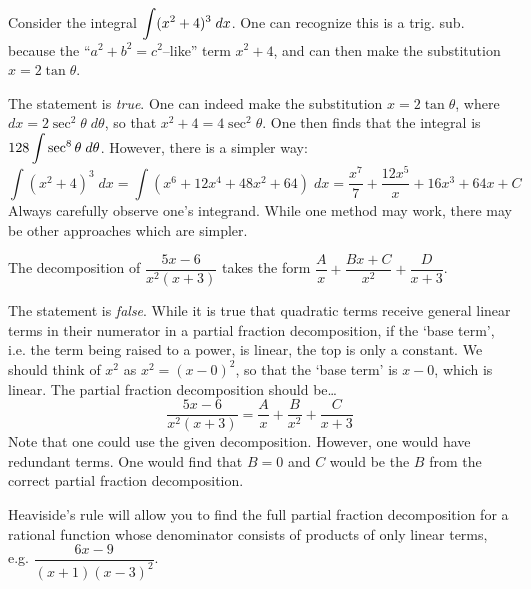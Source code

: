 \documentclass[11pt,letterpaper]{article}
\begin{document}
\newpage



 Consider the integral $\displaystyle\int (x^2 + 4)^3 \;dx$. One can recognize this is a trig. sub. because the ``$a^2 + b^2= c^2$--like'' term $x^2 + 4$, and can then make the substitution $x= 2 \tan \theta$. \pspace

\sol The statement is \textit{true}. One can indeed make the substitution $x= 2 \tan \theta$, where $dx= 2 \sec^2 \theta \;d\theta$, so that $x^2 + 4= 4 \sec^2 \theta$. One then finds that the integral is $\displaystyle 128 \int \sec^8 \theta \;d\theta$. However, there is a simpler way:
	\[
	\int (x^2 + 4)^3 \;dx= \int \left( x^6 + 12x^4 + 48x^2 + 64 \right) \;dx= \dfrac{x^7}{7} + \dfrac{12x^5}{x} + 16x^3 + 64x + C
	\]
Always carefully observe one's integrand. While one method may work, there may be other approaches which are simpler. \pvspace{1.3cm}



 The decomposition of $\dfrac{5x - 6}{x^2(x + 3)}$ takes the form $\dfrac{A}{x} + \dfrac{Bx + C}{x^2} + \dfrac{D}{x + 3}$. \pspace

\sol The statement is \textit{false}. While it is true that quadratic terms receive general linear terms in their numerator in a partial fraction decomposition, if the `base term', i.e. the term being raised to a power, is linear, the top is only a constant. We should think of $x^2$ as $x^2= (x - 0)^2$, so that the `base term' is $x - 0$, which is linear. The partial fraction decomposition should be\dots
	\[
	\dfrac{5x - 6}{x^2(x + 3)}= \dfrac{A}{x} + \dfrac{B}{x^2} + \dfrac{C}{x + 3}
	\]
Note that one could use the given decomposition. However, one would have redundant terms. One would find that $B= 0$ and $C$ would be the $B$ from the correct partial fraction decomposition. \pvspace{1.3cm}



 Heaviside's rule will allow you to find the full partial fraction decomposition for a rational function whose denominator consists of products of only linear terms, e.g. $\dfrac{6x - 9}{(x + 1)(x - 3)^2}$. \pspace
\end{document}

